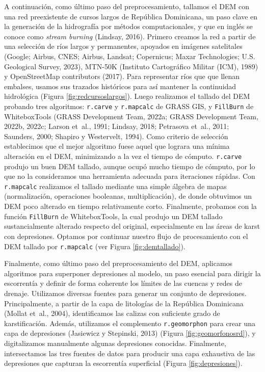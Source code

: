 \documentclass[spanish]{article}
\begin{document}
A continuación, como último paso del preprocesamiento, tallamos el DEM
con una red preexistente de cursos largos de República Dominicana, un
paso clave en la generación de la hidrografía por métodos
computacionales, y que en inglés se conoce como \emph{stream burning}
(Lindsay, 2016). Primero creamos la red a partir de una selección de
ríos largos y permanentes, apoyados en imágenes satelitales (Google;
Airbus, CNES; Airbus, Landsat; Copernicus; Maxar Technologies; U.S.
Geological Survey, 2023), MTN-50K (Instituto Cartográfico Militar (ICM),
1989) y OpenStreetMap contributors (2017). Para representar ríos que que
llenan embalses, usamos sus trazados históricos para así mantener la
continuidad hidrológica (Figura \ref{fig:redcursoslargos}). Luego
realizamos el tallado del DEM probando tres algoritmos: \texttt{r.carve}
y \texttt{r.mapcalc} de GRASS GIS, y \texttt{FillBurn} de WhiteboxTools
(GRASS Development Team, 2022a; GRASS Development Team, 2022b, 2022c;
Larson et~al., 1991; Lindsay, 2018; Petrasova et~al., 2011; Saunders,
2000; Shapiro y Westervelt, 1994). Como criterio de selección
establecimos que el mejor algoritmo fuese aquel que lograra una mínima
alteración en el DEM, minimizando a la vez el tiempo de cómputo.
\texttt{r.carve} produjo un buen DEM tallado, aunque ocupó mucho tiempo
de cómputo, por lo que no la consideramos una herramienta adecuada para
iteraciones rápidas. Con \texttt{r.mapcalc} realizamos el tallado
mediante una simple álgebra de mapas (normalización, operaciones
booleanas, multiplicación), de donde obtuvimos un DEM poco alterado en
tiempo relativamente corto. Finalmente, probamos con la función
\texttt{FillBurn} de WhiteboxTools, la cual produjo un DEM tallado
sustancialmente alterado respecto del original, especialmente en las
áreas de karst con depresiones. Optamos por continuar nuestro flujo de
procesamiento con el DEM tallado por \texttt{r.mapcalc} (ver Figura
\ref{fig:demtallado}).

Finalmente, como último paso del preprocesamiento del DEM, aplicamos
algoritmos para superponer depresiones al modelo, un paso esencial para
dirigir la escorrentía y definir de forma coherente los límites de las
cuencas y redes de drenaje. Utilizamos diversas fuentes para generar un
conjunto de depresiones. Principalmente, a partir de la capa de
litologías de la República Dominicana (Mollat et~al., 2004),
identificamos las calizas con suficiente grado de karstificación.
Además, utilizamos el complemento \texttt{r.geomorphon} para crear una
capa de depresiones (Jasiewicz y Stepinski, 2013) (Figura
\ref{fig:geomorfonosrd}), y digitalizamos manualmente algunas
depresiones conocidas. Finalmente, intersectamos las tres fuentes de
datos para producir una capa exhaustiva de las depresiones que capturan
la escorrentía superficial (Figura \ref{fig:depresiones}).
\end{document}
